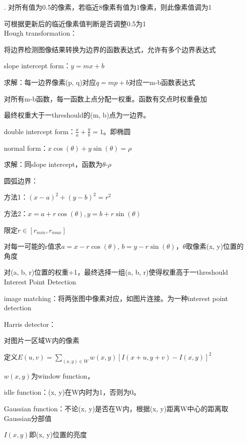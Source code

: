 \documentclass[UTF8]{ctexart}
\begin{document}
  . 对所有值为0.5的像素，若临近8像素有值为1像素，则此像素值调为1

  \quad \quad 可根据更新后的临近像素值判断是否调整0.5为1\\
Hough transformation：

  将边界检测图像结果转换为边界的函数表达式，允许有多个边界表达式

  \quad slope intercept form：$y = mx + b$

  \quad \quad 求解：每一边界像素(p, q)对应$q = mp + b$对应一m-b函数表达式

  \quad \quad \quad 对所有m-b函数，每一函数上点分配一权重。函数有交点时权重叠加
  
  \quad \quad \quad 最终权重大于一threshould的(m, b)点为一边界。

  \quad double intercept form：$\frac{x}{a} + \frac{y}{b} = 1$。即椭圆

  \quad normal form：$x\cos(\theta) + y\sin(\theta) = \rho$

  \quad \quad 求解：同slope intercept，函数为$\theta$-$\rho$

  \quad 圆弧边界：

  \quad \quad 方法1：$(x - a)^2 + (y - b)^2 = r^2$

  \quad \quad 方法2：$x = a + r\cos(\theta), y = b + r\sin(\theta)$
  
  \quad \quad \quad 限定$r \in [r_{min}, r_{max}]$

  \quad \quad \quad 对每一可能的r值求$a = x - r\cos(\theta)$, $b = y - r\sin(\theta)$，$\theta$取像素(x, y)位置的角度

  \quad \quad \quad 对(a, b, r)位置的权重+1，最终选择一组(a, b, r)使得权重高于一threshould\\
Interest Point Detection 

  image matching：将两张图中像素对应，如图片连接。为一种interest point detection 

  Harris detector：

  \quad 对图片一区域W内的像素

  \quad 定义$E(u, v) = \sum_{(x, y) \in W} w(x, y)[I(x + u, y + v) - I(x, y)]^2$

  \quad \quad $w(x, y)$为window function，
  
  \quad \quad \quad idle function：(x, y)在W内时为1，否则为0。
  
  \quad \quad \quad Gaussian function：不论(x, y)是否在W内，根据(x, y)距离W中心的距离取Gaussian分部值

  \quad \quad $I(x, y)$即(x, y)位置的亮度
  
\end{document}

